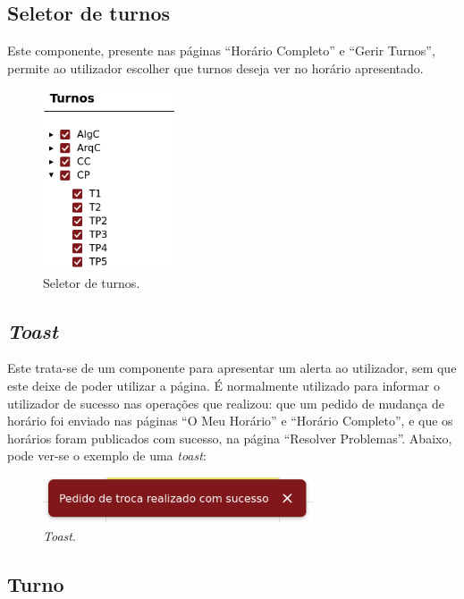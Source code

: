 \documentclass[12pt, a4paper]{article}
\begin{document}
\subsection{Seletor de turnos}

Este componente, presente nas páginas ``Horário Completo'' e ``Gerir Turnos'', permite ao utilizador
escolher que turnos deseja ver no horário apresentado.

\begin{figure}[H]
    \centering
    \includegraphics[width=4cm]{res/components/shift-selector.png}
    \caption{Seletor de turnos.}
    \label{shift-selector}
\end{figure}

\subsection{\emph{Toast}}

Este trata-se de um componente para apresentar um alerta ao utilizador, sem que este deixe de poder
utilizar a página. É normalmente utilizado para informar o utilizador de sucesso nas operações que
realizou: que um pedido de mudança de horário foi enviado nas páginas ``O Meu Horário'' e
``Horário Completo'', e que os horários foram publicados com sucesso, na página
``Resolver Problemas''. Abaixo, pode ver-se o exemplo de uma \emph{toast}:

\begin{figure}[H]
    \centering
    \includegraphics[width=8cm]{res/components/toast.png}
    \caption{\emph{Toast}.}
    \label{toast}
\end{figure}

\subsection{Turno}
\end{document}
